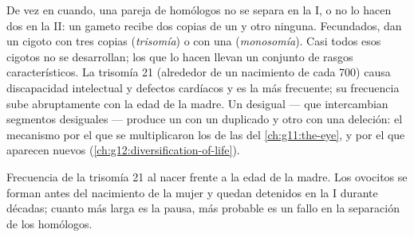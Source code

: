 \begin{proposition}\label{prop:g12:meiosis-genetic-shuffling:errors}
De vez en cuando, una pareja de homólogos no se separa en la  I,
o no lo hacen dos  en la  II: un gameto recibe dos
copias de un  y otro ninguna. Fecundados, dan un cigoto con
tres copias (\emph{trisomía}) o con una (\emph{monosomía}). Casi todos
esos cigotos no se desarrollan; los que lo hacen llevan un conjunto de
rasgos característicos. La trisomía 21 (alrededor de un nacimiento de
cada 700) causa discapacidad intelectual y defectos cardíacos y es la
más frecuente; su frecuencia sube abruptamente con la edad de la madre.
Un  desigual ---  que intercambian segmentos
desiguales --- produce un  con un  duplicado y otro con una
deleción: el mecanismo por el que se multiplicaron los  de las
 del \cref{ch:g11:the-eye}, y por el que aparecen  nuevos
(\cref{ch:g12:diversification-of-life}).
\end{proposition}
\admitted

\begin{omfigure}

{\small Frecuencia de la trisomía 21 al nacer frente a la edad de la
madre. Los ovocitos se forman antes del nacimiento de la mujer y quedan
detenidos en la  I durante décadas; cuanto más larga es la
pausa, más probable es un fallo en la separación de los homólogos.}
\end{omfigure}

